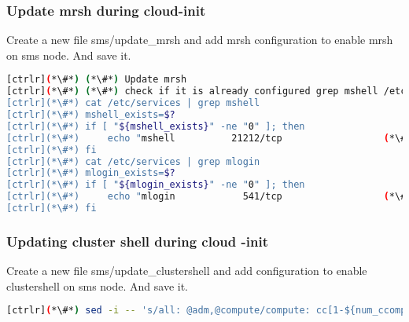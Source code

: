 \subsubsection{Update mrsh during cloud-init}
 
Create a new file sms/update\_mrsh and add mrsh configuration to enable mrsh on sms node. And save it. 

\begin{lstlisting}[language=bash,keywords={}]
[ctrlr](*\#*) (*\#*) Update mrsh
[ctrlr](*\#*) (*\#*) check if it is already configured grep mshell /etc/services will return non-zero, else configure"
[ctrlr](*\#*) cat /etc/services | grep mshell
[ctrlr](*\#*) mshell_exists=$?
[ctrlr](*\#*) if [ "${mshell_exists}" -ne "0" ]; then
[ctrlr](*\#*)     echo "mshell          21212/tcp                  (*\#*) mrshd" >> /etc/services
[ctrlr](*\#*) fi
[ctrlr](*\#*) cat /etc/services | grep mlogin
[ctrlr](*\#*) mlogin_exists=$?
[ctrlr](*\#*) if [ "${mlogin_exists}" -ne "0" ]; then
[ctrlr](*\#*)     echo "mlogin            541/tcp                  (*\#*) mrlogind" >> /etc/services
[ctrlr](*\#*) fi
\end{lstlisting}


\subsubsection{Updating cluster shell during cloud -init}
Create a new file sms/update\_clustershell and add configuration to enable clustershell on sms node. And save it. 

\begin{lstlisting}[language=bash,keywords={}]
[ctrlr](*\#*) sed -i -- 's/all: @adm,@compute/compute: cc[1-${num_ccomputes}]\n&/' /etc/clustershell/groups.d/local.cfg
\end{lstlisting}